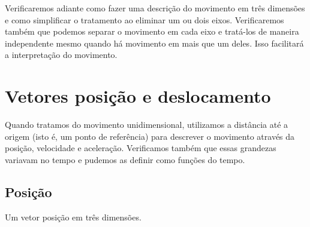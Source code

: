 Verificaremos adiante como fazer uma descrição do movimento em três dimensões e como simplificar o tratamento ao eliminar um ou dois eixos. Verificaremos também que podemos separar o movimento em cada eixo e tratá-los de maneira independente mesmo quando há movimento em mais que um deles. Isso facilitará a interpretação do movimento. 

\section{Vetores posição e deslocamento}

Quando tratamos do movimento unidimensional, utilizamos a distância até a origem (isto é, um ponto de referência) para descrever o movimento através da posição, velocidade e aceleração. Verificamos também que essas grandezas variavam no tempo e pudemos as definir como funções do tempo.

\subsection{Posição}

\begin{marginfigure}
\centering
{}
\caption{Um vetor posição em três dimensões.}
\end{marginfigure}

